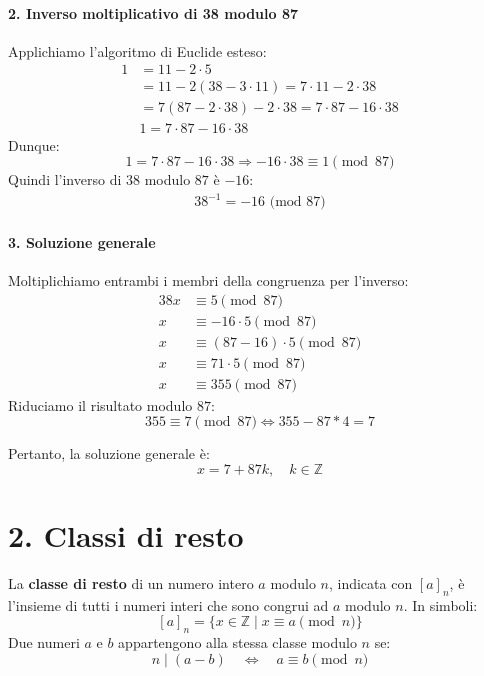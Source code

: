 \documentclass[a4paper,12pt]{article}
\begin{document}
\paragraph{2. Inverso moltiplicativo di 38 modulo 87}
Applichiamo l'algoritmo di Euclide esteso:
\[
\begin{aligned}
1 &= 11 - 2 \cdot 5 \\
  &= 11 - 2(38 - 3 \cdot 11) = 7 \cdot 11 - 2 \cdot 38 \\
  &= 7(87 - 2 \cdot 38) - 2 \cdot 38 = 7 \cdot 87 - 16 \cdot 38 \\
&\boxed{1 = 7 \cdot 87 - 16 \cdot 38}
\end{aligned}
\]
Dunque:
\[
1 = 7 \cdot 87 - 16 \cdot 38 \Rightarrow -16 \cdot 38 \equiv 1 \pmod{87}
\]
Quindi l'inverso di \(38\) modulo \(87\) è \(-16\): 
\begin{align*}
    \boxed{38^{-1} = -16 \text{ (mod 87)}}
\end{align*}

\paragraph{3. Soluzione generale}
Moltiplichiamo entrambi i membri della congruenza per l'inverso:
\begin{align*}
    38x &\equiv 5 \pmod{87} \\
    x &\equiv -16 \cdot 5 \pmod{87} \\
    x &\equiv (87-16) \cdot 5 \pmod{87} \\
    x &\equiv 71 \cdot 5 \pmod{87} \\
    x &\equiv 355 \pmod{87}
\end{align*}
Riduciamo il risultato modulo \(87\):
\[
355 \equiv \boxed{7} \pmod{87} \iff 355-87*4=\boxed{7}
\]

Pertanto, la soluzione generale è:
\[
\boxed{x = 7 + 87k, \quad k \in \mathbb{Z}}
\]



\section*{2. Classi di resto}

La \textbf{classe di resto} di un numero intero \(a\) modulo \(n\), indicata con \([a]_n\), è l’insieme di tutti i numeri interi che sono congrui ad \(a\) modulo \(n\). In simboli:
\[
[a]_n = \{x \in \mathbb{Z} \mid x \equiv a \pmod{n} \}
\]
Due numeri \(a\) e \(b\) appartengono alla stessa classe modulo \(n\) se:
\[
n \mid (a - b) \quad \Longleftrightarrow \quad a \equiv b \pmod{n}
\]
\end{document}
